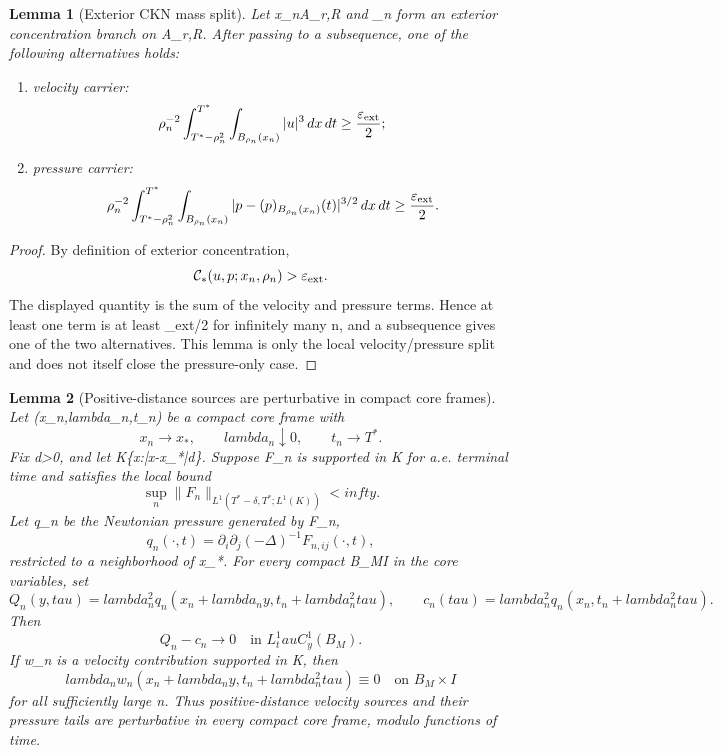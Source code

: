 \documentclass[11pt]{amsart}
\def\({}%
\def\){}%
\def\tau{tau}%
\def\lambda{lambda}%
\def\infty{infty}%
\theoremstyle{plain}
\newtheorem{lemma}[lemma]{Lemma}
\theoremstyle{definition}
\theoremstyle{remark}
\begin{document}
\begin{lemma}[Exterior CKN mass split]
\label{paper8:lem:exterior-ckn-carrier-or-pressure-route}
Let \(x_n\in A_{r,R}\) and \(\rho_n\) form an exterior
concentration branch on \(A_{r,R}\).  After passing to a subsequence, one of
the following alternatives holds:
\begin{enumerate}[label=\textup{(\roman*)}]
\item \emph{velocity carrier:}
\[
  \rho_n^{-2}
  \int_{T^*-\rho_n^2}^{T^*}\int_{B_{\rho_n}(x_n)}
  |u|^3\,dx\,dt
  \ge \frac{\varepsilon_{\rm ext}}{2};
\]
\item \emph{pressure carrier:}
\[
  \rho_n^{-2}
  \int_{T^*-\rho_n^2}^{T^*}\int_{B_{\rho_n}(x_n)}
  |p-(p)_{B_{\rho_n}(x_n)}(t)|^{3/2}\,dx\,dt
  \ge \frac{\varepsilon_{\rm ext}}{2}.
\]
\end{enumerate}
\end{lemma}

\begin{proof}
By definition of exterior concentration,
\[
  \mathcal C_*(u,p;x_n,\rho_n)>\varepsilon_{\rm ext}.
\]
The displayed quantity is the sum of the velocity and pressure terms.  Hence at
least one term is at least \(\varepsilon_{\rm ext}/2\) for infinitely many
\(n\), and a subsequence gives one of the two alternatives.  This lemma is only
the local velocity/pressure split and does not itself close the pressure-only
case.
\end{proof}

\begin{lemma}[Positive-distance sources are perturbative in compact core frames]
\label{paper8:lem:positive-distance-sources-core-perturbative}
Let \((x_n,\lambda_n,t_n)\) be a compact core frame with
\[
  x_n\to x_*,
  \qquad
  \lambda_n\downarrow0,
  \qquad
  t_n\to T^*.
\]
Fix \(d>0\), and let \(K\Subset\{x:|x-x_*|\ge d\}\).  Suppose
\(F_n\) is supported in \(K\) for a.e. terminal time and satisfies the local
bound
\[
  \sup_n\|F_n\|_{L^1(T^*-\delta,T^*;L^1(K))}<\infty .
\]
Let \(q_n\) be the Newtonian pressure generated by \(F_n\),
\[
  q_n(\cdot,t)=\partial_i\partial_j(-\Delta)^{-1}F_{n,ij}(\cdot,t),
\]
restricted to a neighborhood of \(x_*\).  For every compact
\(B_M\times I\) in the core variables, set
\[
  Q_n(y,\tau)
  =
  \lambda_n^2 q_n(x_n+\lambda_n y,t_n+\lambda_n^2\tau),
  \qquad
  c_n(\tau)=\lambda_n^2 q_n(x_n,t_n+\lambda_n^2\tau).
\]
Then
\[
  Q_n-c_n\to0
  \quad\text{in }L^1_\tau C^1_y(B_M).
\]
If \(w_n\) is a velocity contribution supported in \(K\), then
\[
  \lambda_n w_n(x_n+\lambda_n y,t_n+\lambda_n^2\tau)\equiv0
  \quad\text{on }B_M\times I
\]
for all sufficiently large \(n\).  Thus positive-distance velocity sources and
their pressure tails are perturbative in every compact core frame, modulo
functions of time.
\end{lemma}
\end{document}
